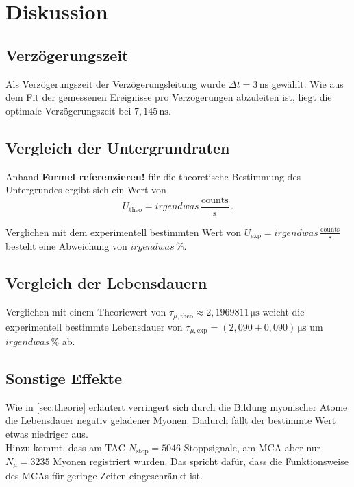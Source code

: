 \section{Diskussion}
\label{sec:Diskussion}

\subsection{Verzögerungszeit}

Als Verzögerungszeit der Verzögerungsleitung wurde $\Delta t = 3 \,\unit{\nano\second}$ gewählt.
Wie aus dem Fit der gemessenen Ereignisse pro Verzögerungen abzuleiten ist, liegt die optimale Verzögerungszeit bei
$7,145 \,\unit{\nano\second}$.


\subsection{Vergleich der Untergrundraten}

Anhand \textbf{Formel referenzieren!} für die theoretische Bestimmung des Untergrundes ergibt sich ein Wert von
\begin{equation}
    U_\text{theo} = irgendwas \,\frac{\text{counts}}{\unit{\second}} \,.
\end{equation}

Verglichen mit dem experimentell bestimmten Wert von $U_\text{exp} = irgendwas \,\frac{\text{counts}}{\unit{\second}}$ besteht eine Abweichung von
$irgendwas \,\%$.

\subsection{Vergleich der Lebensdauern}

Verglichen mit einem Theoriewert von $\tau_{\mu,\text{theo}} \approx 2,196 981 1 \,\unit{\micro\second}$ \cite{pdg} weicht die experimentell bestimmte Lebensdauer von
$\tau_{\mu,\text{exp}} =  \left(2,090  \pm 0,090 \right) \,\unit{\micro\second}$ um $irgendwas \,\%$ ab.


\subsection{Sonstige Effekte}

Wie in \autoref{sec:theorie} erläutert verringert sich durch die Bildung myonischer Atome die Lebensdauer
negativ geladener Myonen. Dadurch fällt der bestimmte Wert etwas niedriger aus. \\

Hinzu kommt, dass am TAC $N_\text{stop} = 5046$ Stoppsignale, am MCA aber nur $N_{\mu} = 3235$ Myonen registriert wurden. Das spricht dafür,
dass die Funktionsweise des MCAs für geringe Zeiten eingeschränkt ist.
